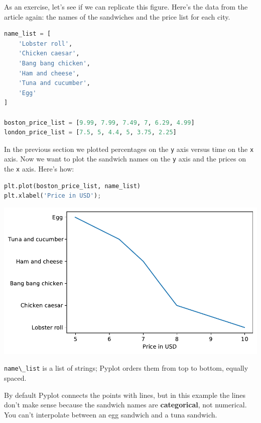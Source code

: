 As an exercise, let's see if we can replicate this figure. Here's the
data from the article again: the names of the sandwiches and the price
list for each city.

\begin{lstlisting}[language=Python]
name_list = [
    'Lobster roll',
    'Chicken caesar',
    'Bang bang chicken',
    'Ham and cheese',
    'Tuna and cucumber',
    'Egg'
]

boston_price_list = [9.99, 7.99, 7.49, 7, 6.29, 4.99]
london_price_list = [7.5, 5, 4.4, 5, 3.75, 2.25]
\end{lstlisting}

In the previous section we plotted percentages on the
\passthrough{\lstinline!y!} axis versus time on the
\passthrough{\lstinline!x!} axis. Now we want to plot the sandwich names
on the \passthrough{\lstinline!y!} axis and the prices on the
\passthrough{\lstinline!x!} axis. Here's how:

\begin{lstlisting}[language=Python]
plt.plot(boston_price_list, name_list)
plt.xlabel('Price in USD');
\end{lstlisting}

\begin{center}
\includegraphics[scale=0.75]{chapters/06_plotting_files/06_plotting_40_0.pdf}
\end{center}

\passthrough{\lstinline!name\_list!} is a list of strings; Pyplot orders
them from top to bottom, equally spaced.

By default Pyplot connects the points with lines, but in this example
the lines don't make sense because the sandwich names are
\textbf{categorical}, not numerical. You can't interpolate between an
egg sandwich and a tuna sandwich.

